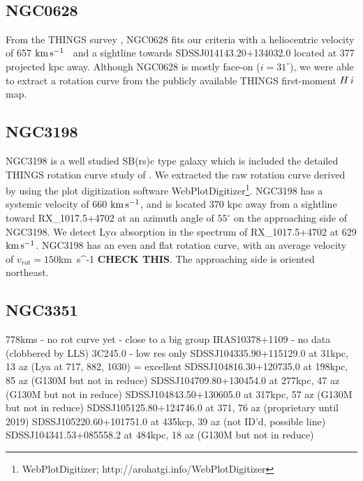 \documentclass[iop]{emulateapj-rtx4}
\newcommand{\kms}{$\rm km\, s^{-1}$}
\newcommand{\HI}{$H\,{\sc i}$}
\begin{document}
\\


\subsection{NGC0628}
From the THINGS survey \citep{walter2008}, NGC0628 fits our criteria with a heliocentric velocity of 657 \kms~ and a sightline towards SDSSJ014143.20+134032.0 located at 377 projected kpc away. Although NGC0628 is mostly face-on ($i = 31^{\circ}$), we were able to extract a rotation curve from the publicly available THINGS first-moment \HI map. 



\subsection{NGC3198}
NGC3198 is a well studied SB(rs)c type galaxy which is included the detailed THINGS rotation curve study of \cite{deblok2008}. We extracted the raw rotation curve derived by \cite{deblok2008} using the plot digitization software WebPlotDigitizer\footnote{WebPlotDigitizer; http://arohatgi.info/WebPlotDigitizer}. NGC3198 has a systemic velocity of 660 \kms, and is located 370 kpc away from a sightline toward RX\_1017.5+4702 at an azimuth angle of $55^{\circ}$ on the approaching side of NGC3198. We detect Ly$\alpha$ absorption in the spectrum of RX\_1017.5+4702 at 629 \kms. NGC3198 has an even and flat rotation curve, with an average velocity of $v_{rot} = 150 \kms$ \textbf{CHECK THIS}. The approaching side is oriented northeast.



\subsection{NGC3351}
\cite{mazzalay2014}
778kms - no rot curve yet - close to a big group
IRAS10378+1109 - no data (clobbered by LLS)
3C245.0 - low res only
SDSSJ104335.90+115129.0 at 31kpc, 13 az (Lya at 717, 882, 1030) = excellent
SDSSJ104816.30+120735.0 at 198kpc, 85 az (G130M but not in reduce)
SDSSJ104709.80+130454.0 at 277kpc, 47 az (G130M but not in reduce)
SDSSJ104843.50+130605.0 at 317kpc, 57 az (G130M but not in reduce)
SDSSJ105125.80+124746.0 at 371, 76 az (proprietary until 2019)
SDSSJ105220.60+101751.0 at 435kcp, 39 az (not ID'd, possible line)
SDSSJ104341.53+085558.2 at 484kpc, 18 az (G130M but not in reduce)
\end{document}
